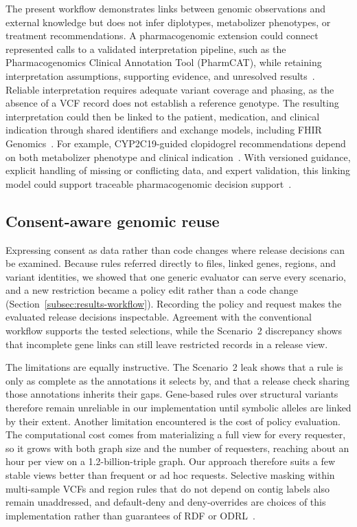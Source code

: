 \documentclass[pdflatex,sn-mathphys-num,referee]{sn-jnl}
\begin{document}
The present workflow demonstrates links between genomic observations and external knowledge but does not infer diplotypes, metabolizer phenotypes, or treatment recommendations.
A pharmacogenomic extension could connect represented calls to a validated interpretation pipeline, such as the Pharmacogenomics Clinical Annotation Tool (PharmCAT), while retaining interpretation assumptions, supporting evidence, and unresolved results~\cite{pharmcat}.
Reliable interpretation requires adequate variant coverage and phasing, as the absence of a VCF record does not establish a reference genotype.
The resulting interpretation could then be linked to the patient, medication, and clinical indication through shared identifiers and exchange models, including FHIR Genomics~\cite{fhir_genomics_ig}.
For example, CYP2C19-guided clopidogrel recommendations depend on both metabolizer phenotype and clinical indication~\cite{lee2022clopidogrel}.
With versioned guidance, explicit handling of missing or conflicting data, and expert validation, this linking model could support traceable pharmacogenomic decision support~\cite{wake2022pgx}.

\subsection{Consent-aware genomic reuse}\label{subsec:disc-consent}
Expressing consent as data rather than code changes where release decisions can be examined.
Because rules referred directly to files, linked genes, regions, and variant identities, we showed that one generic evaluator can serve every scenario, and a new restriction became a policy edit rather than a code change (Section~\ref{subsec:results-workflow}).
Recording the policy and request makes the evaluated release decisions inspectable.
Agreement with the conventional workflow supports the tested selections, while the Scenario~2 discrepancy shows that incomplete gene links can still leave restricted records in a release view.

The limitations are equally instructive.
The Scenario~2 leak shows that a rule is only as complete as the annotations it selects by, and that a release check sharing those annotations inherits their gaps.
Gene-based rules over structural variants therefore remain unreliable in our implementation until symbolic alleles are linked by their extent.
Another limitation encountered is the cost of policy evaluation.
The computational cost comes from materializing a full view for every requester, so it grows with both graph size and the number of requesters, reaching about an hour per view on a 1.2-billion-triple graph.
Our approach therefore suits a few stable views better than frequent or ad hoc requests.
Selective masking within multi-sample VCFs and region rules that do not depend on contig labels also remain unaddressed, and default-deny and deny-overrides are choices of this implementation rather than guarantees of RDF or ODRL~\cite{odrl_2018}.
\end{document}
